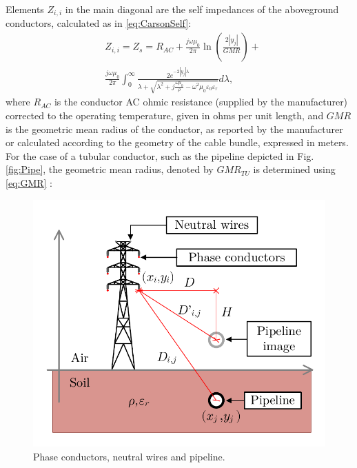 \documentclass[conference]{IEEEtran}
\begin{document}
Elements $Z_{i,i}$ in the main diagonal are the self impedances of the aboveground conductors, calculated as in \eqref{eq:CarsonSelf}:
\begin{equation}\label{eq:CarsonSelf}
	\begin{aligned}
		&Z_{i,i}=Z_{s}=R_{AC}+\frac{j\omega\mu_{0}}{2\pi}\ln\left(\frac{2|y_j|}{GMR}\right) + \\
		&
		\frac{j\omega\mu_{0}}{2\pi}\int_{0}^{\infty}\frac{2e^{-2|y_j|\lambda}}{\lambda+\sqrt{\lambda^2+j\frac{\omega\mu_{0}}{\rho}-\omega^2\mu_{0}\varepsilon_{0}\varepsilon_{r}}} d\lambda,
	\end{aligned}
\end{equation}
where $R_{AC}$ is the conductor AC ohmic resistance (supplied by the manufacturer) corrected to the operating temperature, given in ohms per unit length, and $GMR$ is the geometric mean radius of the conductor, as reported by the manufacturer or calculated according to the geometry of the cable bundle, expressed in meters. For the case of a tubular conductor, such as the pipeline depicted in Fig. \ref{fig:Pipe}, the geometric mean radius, denoted by $GMR_{TU}$ is determined using \eqref{eq:GMR} \cite{Seneff1947}:
\begin{figure}[!t]
	\begin{center}
		\includegraphics[width=.8\columnwidth]{fig/VistaTorreDuto.pdf}
		\caption{Phase conductors, neutral wires and pipeline.}
		\label{fig:VistaTorreDuto}
	\end{center}
\end{figure}
\end{document}
